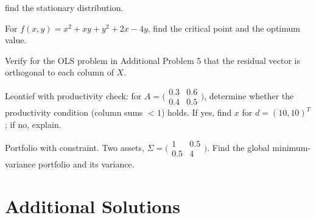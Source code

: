 \begin{problems}
        find the stationary distribution.
  \item For $f(x, y) = x^{2} + x y + y^{2} + 2 x - 4 y$, find the critical
        point and the optimum value.
  \item Verify for the OLS problem in Additional Problem 5 that the residual
        vector is orthogonal to each column of $X$.
  \item Leontief with productivity check: for
        $A = \bigl(\begin{smallmatrix} 0.3 & 0.6 \\ 0.4 & 0.5 \end{smallmatrix}\bigr)$,
        determine whether the productivity condition (column sums $<1$)
        holds. If yes, find $x$ for $d = (10, 10)^{T}$; if no, explain.
  \item Portfolio with constraint. Two assets,
        $\Sigma = \bigl(\begin{smallmatrix} 1 & 0.5 \\ 0.5 & 4 \end{smallmatrix}\bigr)$.
        Find the global minimum-variance portfolio and its variance.
\end{problems}

\section{Additional Solutions}

